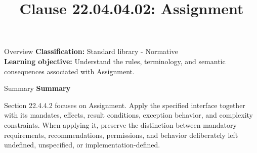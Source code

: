 \documentclass[10pt,letterpaper]{article}
\title{Clause 22.04.04.02: Assignment}
\author{}
\date{}
\begin{document}
\maketitle
\begin{CornellOverviewBox}{Overview}
\textbf{Classification:} Standard library - Normative\\[2pt]
\textbf{Learning objective:} Understand the rules, terminology, and semantic consequences associated with Assignment.
\end{CornellOverviewBox}\begin{CornellSummaryBox}{Summary}
{\sffamily\bfseries\color{Accent} Summary}\par\vspace{3pt}Section 22.4.4.2 focuses on Assignment. Apply the specified interface together with its mandates, effects, result conditions, exception behavior, and complexity constraints. When applying it, preserve the distinction between mandatory requirements, recommendations, permissions, and behavior deliberately left undefined, unspecified, or implementation-defined.
\end{CornellSummaryBox}
\end{document}

